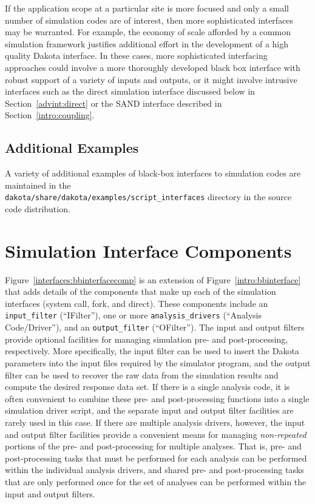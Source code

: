 If the application scope at a particular site is more focused and only
a small number of simulation codes are of interest, then more
sophisticated interfaces may be warranted. For example, the economy of
scale afforded by a common simulation framework justifies additional
effort in the development of a high quality Dakota interface. In these
cases, more sophisticated interfacing approaches could involve a more
thoroughly developed black box interface with robust support of a
variety of inputs and outputs, or it might involve intrusive
interfaces such as the direct simulation interface discussed below in
Section~\ref{advint:direct} or the SAND interface described in
Section~\ref{intro:coupling}.

\subsection{Additional Examples}

A variety of additional examples of black-box interfaces to simulation
codes are maintained in the\\
\texttt{dakota/share/dakota/examples/script\_interfaces} directory in the source
code distribution.


\section{Simulation Interface Components}\label{interfaces:components}


Figure~\ref{interfaces:bbinterfacecomp} is an extension of
Figure~\ref{intro:bbinterface} that adds details of the
components that make up each of the simulation interfaces (system
call, fork, and direct).  These components include an
\texttt{input\_filter} (``IFilter''), one or more
\texttt{analysis\_drivers} (``Analysis Code/Driver''), and an
\texttt{output\_filter} (``OFilter''). The input and output filters
provide optional facilities for managing simulation pre- and
post-processing, respectively. More specifically, the input filter can
be used to insert the Dakota parameters into the input files required
by the simulator program, and the output filter can be used to recover
the raw data from the simulation results and compute the desired
response data set. If there is a single analysis code, it is often
convenient to combine these pre- and post-processing functions into a
single simulation driver script, and the separate input and output
filter facilities are rarely used in this case. If there are multiple
analysis drivers, however, the input and output filter facilities
provide a convenient means for managing \emph{non-repeated} portions of
the pre- and post-processing for multiple analyses. That is, pre- and
post-processing tasks that must be performed for each analysis can be
performed within the individual analysis drivers, and shared pre- and
post-processing tasks that are only performed once for the set of
analyses can be performed within the input and output filters.

